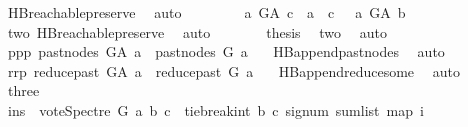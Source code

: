 \begin{isabellebody}
\ HB{}{\isachardot}{\kern0pt}reachable{}{\isacharunderscore}{\kern0pt}preserve\ \isamarkupfalse%
\ auto\isanewline
\ \ \ \ \isamarkupfalse%
\ \isamarkupfalse%
\ {\isachardoublequoteopen}\ {\isacharparenleft}{\kern0pt}a\ {\isasymrightarrow}\isactrlsup {\isacharplus}{\kern0pt}\isactrlbsub G{\isacharunderscore}{\kern0pt}A\isactrlesub \ c\ {\isasymor}\ a\ {\isacharequal}{\kern0pt}\ c{\isacharparenright}{\kern0pt}\ {\isasymand}\ {\isacharparenleft}{\kern0pt}{\isasymnot}\ a\ {\isasymrightarrow}\isactrlsup {\isacharplus}{\kern0pt}\isactrlbsub G{\isacharunderscore}{\kern0pt}A\isactrlesub \ b{\isacharparenright}{\kern0pt}{\isachardoublequoteclose}\ \isanewline
\ \ \ \ \ \ \isamarkupfalse%
\ two\ HB{}{\isachardot}{\kern0pt}reachable{}{\isacharunderscore}{\kern0pt}preserve\ \isamarkupfalse%
\ auto\isanewline
\ \ \ \ \isamarkupfalse%
\ \isamarkupfalse%
\ {\isacharquery}{\kern0pt}thesis\ \isamarkupfalse%
\ two\ \isamarkupfalse%
\ auto\isanewline
\ \ \isamarkupfalse%
\isanewline
\ \ \ \ \isamarkupfalse%
\ ppp{\isacharcolon}{\kern0pt}\ {\isachardoublequoteopen}past{\isacharunderscore}{\kern0pt}nodes\ G{\isacharunderscore}{\kern0pt}A\ a\ {\isacharequal}{\kern0pt}\ past{\isacharunderscore}{\kern0pt}nodes\ G\ a{\isachardoublequoteclose}\ \isamarkupfalse%
\ {}{\isacharparenleft}{\kern0pt}{}{\isacharparenright}{\kern0pt}\ HB{}{\isachardot}{\kern0pt}append{\isacharunderscore}{\kern0pt}past{\isacharunderscore}{\kern0pt}nodes\ \isamarkupfalse%
\ auto\isanewline
\ \ \ \ \isamarkupfalse%
\ rrp{\isacharcolon}{\kern0pt}\ {\isachardoublequoteopen}reduce{\isacharunderscore}{\kern0pt}past\ G{\isacharunderscore}{\kern0pt}A\ a\ {\isacharequal}{\kern0pt}\ reduce{\isacharunderscore}{\kern0pt}past\ G\ a{\isachardoublequoteclose}\ \isamarkupfalse%
\ {}{\isacharparenleft}{\kern0pt}{}{\isacharparenright}{\kern0pt}\ HB{}{\isachardot}{\kern0pt}append{\isacharunderscore}{\kern0pt}reduce{\isacharunderscore}{\kern0pt}some\ \isamarkupfalse%
\ auto\isanewline
\ \ \ \ \isamarkupfalse%
\ three\isanewline
\ \ \ \ \isamarkupfalse%
\ \isamarkupfalse%
\ ins{\isacharcolon}{\kern0pt}\ {\isachardoublequoteopen}\ vote{\isacharunderscore}{\kern0pt}Spectre\ G\ a\ b\ c\ {\isacharequal}{\kern0pt}\ {\isacharparenleft}{\kern0pt}tie{\isacharunderscore}{\kern0pt}break{\isacharunderscore}{\kern0pt}int\ b\ c\ {\isacharparenleft}{\kern0pt}signum\ {\isacharparenleft}{\kern0pt}sum{\isacharunderscore}{\kern0pt}list\ {\isacharparenleft}{\kern0pt}map\ {\isacharparenleft}{\kern0pt}{\isasymlambda}i{\isachardot}{\kern0pt}\isanewline

\end{isabellebody}
